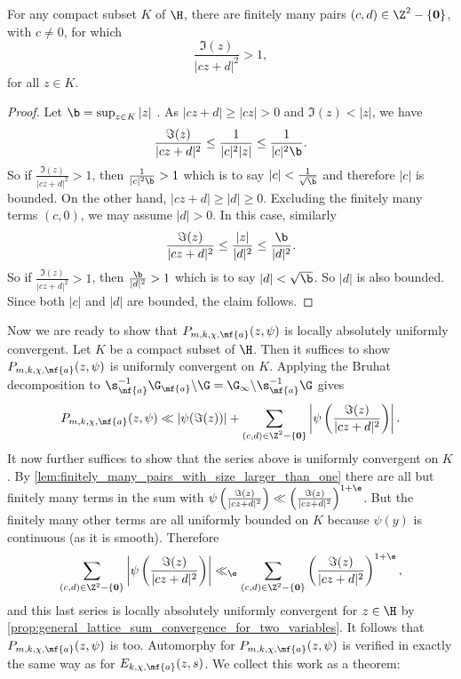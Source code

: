     \begin{lemma}\label{lem:finitely_many_pairs_with_size_larger_than_one}
      For any compact subset $K$ of $\H$, there are finitely many pairs $(c,d) \in \Z^{2}-\{\mathbf{0}\}$, with $c \neq 0$, for which
      \[
        \frac{\Im(z)}{|cz+d|^{2}} > 1,
      \]
      for all $z \in K$.
      \end{lemma}
      \begin{proof}
      Let $\b = \sup_{z \in K}|z|$ . As $|cz+d| \ge |cz| > 0$ and $\Im(z) < |z|$, we have
      \[
        \frac{\Im(z)}{|cz+d|^{2}} \le \frac{1}{|c|^{2}|z|} \le \frac{1}{|c|^{2}\b}.
      \]
      So if $\frac{\Im(z)}{|cz+d|^{2}} > 1$, then $\frac{1}{|c|^{2}\b} > 1$ which is to say $|c| < \frac{1}{\sqrt{\b}}$ and therefore $|c|$ is bounded. On the other hand, $|cz+d| \ge |d| \ge 0$. Excluding the finitely many terms $(c,0)$, we may assume $|d| > 0$. In this case, similarly  
      \[
        \frac{\Im(z)}{|cz+d|^{2}} \le \frac{|z|}{|d|^{2}} \le \frac{\b}{|d|^{2}}.
      \]
      So if $\frac{\Im(z)}{|cz+d|^{2}} > 1$, then $\frac{\b}{|d|^{2}}> 1$ which is to say $|d| < \sqrt{\b}$. So $|d|$ is also bounded. Since both $|c|$ and $|d|$ are bounded, the claim follows.
    \end{proof}
    
    Now we are ready to show that $P_{m,k,\chi,\mf{a}}(z,\psi)$ is locally absolutely uniformly convergent. Let $K$ be a compact subset of $\H$. Then it suffices to show $P_{m,k,\chi,\mf{a}}(z,\psi)$ is uniformly convergent on $K$. Applying the Bruhat decomposition to $\s_{\mf{a}}^{-1}\G_{\mf{a}}\backslash\G = \G_{\infty}\backslash\s_{\mf{a}}^{-1}\G$ gives
    \[
      P_{m,k,\chi,\mf{a}}(z,\psi) \ll |\psi(\Im(z))|+\sum_{\substack{(c,d) \in \Z^{2}-\{\mathbf{0}\}}}\left|\psi\left(\frac{\Im(z)}{|cz+d|^{2}}\right)\right|.
    \]
    It now further suffices to show that the series above is uniformly convergent on $K$. By \cref{lem:finitely_many_pairs_with_size_larger_than_one} there are all but finitely many terms in the sum with $\psi\left(\frac{\Im(z)}{|cz+d|^{2}}\right) \ll \left(\frac{\Im(z)}{|cz+d|^{2}}\right)^{1+\e}$. But the finitely many other terms are all uniformly bounded on $K$ because $\psi(y)$ is continuous (as it is smooth). Therefore
    \[
      \sum_{(c,d) \in \Z^{2}-\{\mathbf{0}\}}\left|\psi\left(\frac{\Im(z)}{|cz+d|^{2}}\right)\right| \ll_{\e} \sum_{(c,d) \in \Z^{2}-\{\mathbf{0}\}}\left(\frac{\Im(z)}{|cz+d|^{2}}\right)^{1+\e},
    \]
    and this last series is locally absolutely uniformly convergent for $z \in \H$ by \cref{prop:general_lattice_sum_convergence_for_two_variables}. It follows that $P_{m,k,\chi,\mf{a}}(z,\psi)$ is too. Automorphy for $P_{m,k,\chi,\mf{a}}(z,\psi)$ is verified in exactly the same way as for $E_{k,\chi,\mf{a}}(z,s)$. We collect this work as a theorem:

